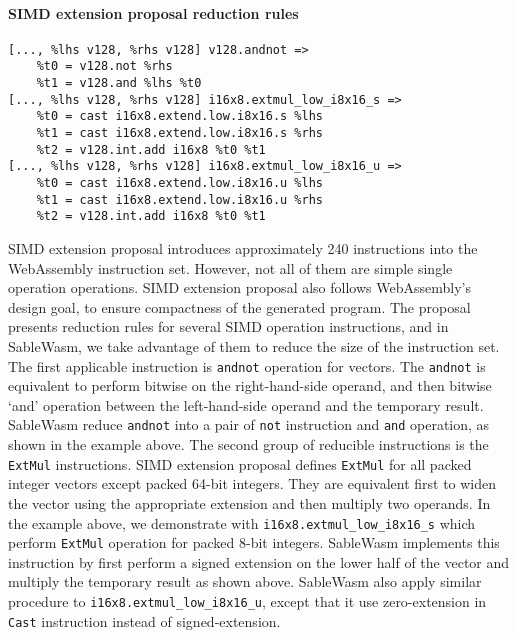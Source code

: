 \paragraph{SIMD extension proposal reduction rules} \quad
\begin{lstlisting}[basicstyle=\linespread{1}\small, language=SableWasmMIR]
[..., %lhs v128, %rhs v128] v128.andnot =>
    %t0 = v128.not %rhs 
    %t1 = v128.and %lhs %t0
[..., %lhs v128, %rhs v128] i16x8.extmul_low_i8x16_s =>
    %t0 = cast i16x8.extend.low.i8x16.s %lhs
    %t1 = cast i16x8.extend.low.i8x16.s %rhs
    %t2 = v128.int.add i16x8 %t0 %t1
[..., %lhs v128, %rhs v128] i16x8.extmul_low_i8x16_u =>
    %t0 = cast i16x8.extend.low.i8x16.u %lhs
    %t1 = cast i16x8.extend.low.i8x16.u %rhs
    %t2 = v128.int.add i16x8 %t0 %t1
\end{lstlisting}
SIMD extension proposal introduces approximately 240 instructions into the WebAssembly instruction set. However, not all of them are simple single operation operations. SIMD extension proposal also follows WebAssembly's design goal, to ensure compactness of the generated program. The proposal presents reduction rules for several SIMD operation instructions, and in SableWasm, we take advantage of them to reduce the size of the instruction set. The first applicable instruction is \texttt{andnot} operation for vectors. The \texttt{andnot} is equivalent to perform bitwise on the right-hand-side operand, and then bitwise `and' operation between the left-hand-side operand and the temporary result. SableWasm reduce \texttt{andnot} into a pair of \texttt{not} instruction and \texttt{and} operation, as shown in the example above. The second group of reducible instructions is the \texttt{ExtMul} instructions. SIMD extension proposal defines \texttt{ExtMul} for all packed integer vectors except packed 64-bit integers. They are equivalent first to widen the vector using the appropriate extension and then multiply two operands. In the example above, we demonstrate with \texttt{i16x8.extmul\_low\_i8x16\_s} which perform \texttt{ExtMul} operation for packed 8-bit integers. SableWasm implements this instruction by first perform a signed extension on the lower half of the vector and multiply the temporary result as shown above. SableWasm also apply similar procedure to \texttt{i16x8.extmul\_low\_i8x16\_u}, except that it use zero-extension in \texttt{Cast} instruction instead of signed-extension.

